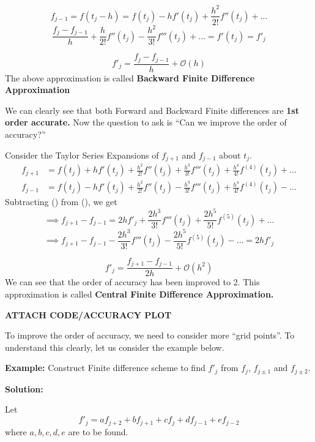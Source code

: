 \documentclass[
]{book}
\begin{document}
\[f_{j-1} = f(t_j-h)= f(t_j)-hf'(t_j)+\frac{h^2}{2!}f''(t_j)+\dots\]
\[\dfrac{f_{j}-f_{j-1}}{h}+\frac{h}{2!}f''(t_j)-\frac{h^2}{3!}f'''(t_j)+\dots = f'(t_j) = f'_j\]

\begin{equation}
f'_j = \dfrac{f_{j}-f_{j-1}}{h} + \mathcal{O}(h)
\end{equation}
The above approximation is called \textbf{Backward Finite Difference Approximation}

We can clearly see that both Forward and Backward Finite differences are \textbf{1st order accurate.} Now the question to ask is ``Can we improve the order of accuracy?''

Consider the Taylor Series Expansions of \(f_{j+1}\) and \(f_{j-1}\) about \(t_j\).
\begin{align*}
f_{j+1} &= f(t_j)+hf'(t_j)+\frac{h^2}{2!}f''(t_j)+\frac{h^3}{3!}f'''(t_j)+\frac{h^4}{4!}f^{(4)}(t_j)+\dots\\
f_{j-1} &= f(t_j)-hf'(t_j)+\frac{h^2}{2!}f''(t_j)-\frac{h^3}{3!}f'''(t_j)+\frac{h^4}{4!}f^{(4)}(t_j)-\dots
\end{align*}
Subtracting () from (), we get
\[\implies f_{j+1}-f_{j-1} = 2hf'_j+\frac{2h^3}{3!}f'''(t_j)+\frac{2h^5}{5!}f^{(5)}(t_j)+\dots\]
\[\implies f_{j+1}-f_{j-1}-\frac{2h^3}{3!}f'''(t_j)-\frac{2h^5}{5!}f^{(5)}(t_j)-\dots = 2hf'_j\]

\begin{equation}
f'_j = \frac{f_{j+1}-f_{j-1}}{2h} + \mathcal{O}(h^2)
\end{equation}
We can see that the order of accuracy has been improved to 2. This approximation is called \textbf{Central Finite Difference Approximation.}

\textbf{ATTACH CODE/ACCURACY PLOT}

To improve the order of accuracy, we need to consider more ``grid points''. To understand this clearly, let us consider the example below.

\textbf{Example:} Construct Finite difference scheme to find \(f'_j\) from \(f_j\), \(f_{j\pm 1}\) and \(f_{j \pm 2}\).

\textbf{Solution:}

Let
\begin{equation}
f'_j = a f_{j+2}+b f_{j+1}+cf_{j}+d f_{j-1}+e f_{j-2}
\end{equation}
where \(a,b,c,d,e\) are to be found.
\end{document}
